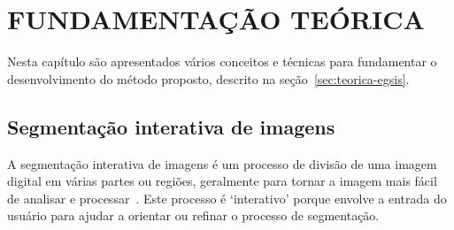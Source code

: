 \chapter{FUNDAMENTAÇÃO TEÓRICA}\label{cap:fundamentacao-teorica}


Nesta capítulo são apresentados vários conceitos e técnicas para fundamentar
o desenvolvimento do método proposto, descrito na seção~\ref{sec:teorica-egsis}.


\section{Segmentação interativa de imagens}\label{sec:segmentacao-interativa}

A segmentação interativa de imagens é um processo de divisão de uma
imagem digital em várias partes ou regiões, geralmente para tornar a
imagem mais fácil de analisar e processar~\cite{ramadan2020survey}. Este processo é `interativo'
porque envolve a entrada do usuário para ajudar a orientar ou refinar
o processo de segmentação.

\begin{figure}[h!]
        \captionsetup{width=12cm}
		\centering
\end{figure}
\FloatBarrier{}

